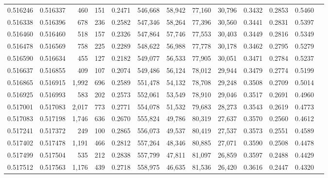 \begin{tabular}{rrrrrrrrrrrrr}
0.516246 & 0.516337 &   460 &   151 &                                     0.2471 & 546,668 &  58,942 &  77,160 &  30,796 & 0.3432 & 0.2853 & 0.5460 \\
0.516338 & 0.516396 &   678 &   236 &                                     0.2582 & 547,346 &  58,264 &  77,396 &  30,560 & 0.3441 & 0.2831 & 0.5397 \\
0.516460 & 0.516460 &   518 &   157 &                                     0.2326 & 547,864 &  57,746 &  77,553 &  30,403 & 0.3449 & 0.2816 & 0.5349 \\
0.516478 & 0.516569 &   758 &   225 &                                     0.2289 & 548,622 &  56,988 &  77,778 &  30,178 & 0.3462 & 0.2795 & 0.5279 \\
0.516590 & 0.516634 &   455 &   127 &                                     0.2182 & 549,077 &  56,533 &  77,905 &  30,051 & 0.3471 & 0.2784 & 0.5237 \\
0.516637 & 0.516855 &   409 &   107 &                                     0.2074 & 549,486 &  56,124 &  78,012 &  29,944 & 0.3479 & 0.2774 & 0.5199 \\
0.516865 & 0.516915 & 1,992 &   696 &                                     0.2589 & 551,478 &  54,132 &  78,708 &  29,248 & 0.3508 & 0.2709 & 0.5014 \\
0.516925 & 0.516993 &   583 &   202 &                                     0.2573 & 552,061 &  53,549 &  78,910 &  29,046 & 0.3517 & 0.2691 & 0.4960 \\
0.517001 & 0.517083 & 2,017 &   773 &                                     0.2771 & 554,078 &  51,532 &  79,683 &  28,273 & 0.3543 & 0.2619 & 0.4773 \\
0.517083 & 0.517198 & 1,746 &   636 &                                     0.2670 & 555,824 &  49,786 &  80,319 &  27,637 & 0.3570 & 0.2560 & 0.4612 \\
0.517241 & 0.517372 &   249 &   100 &                                     0.2865 & 556,073 &  49,537 &  80,419 &  27,537 & 0.3573 & 0.2551 & 0.4589 \\
0.517402 & 0.517478 & 1,191 &   466 &                                     0.2812 & 557,264 &  48,346 &  80,885 &  27,071 & 0.3590 & 0.2508 & 0.4478 \\
0.517499 & 0.517504 &   535 &   212 &                                     0.2838 & 557,799 &  47,811 &  81,097 &  26,859 & 0.3597 & 0.2488 & 0.4429 \\
0.517512 & 0.517563 & 1,176 &   439 &                                     0.2718 & 558,975 &  46,635 &  81,536 &  26,420 & 0.3616 & 0.2447 & 0.4320 \\

\end{tabular}
